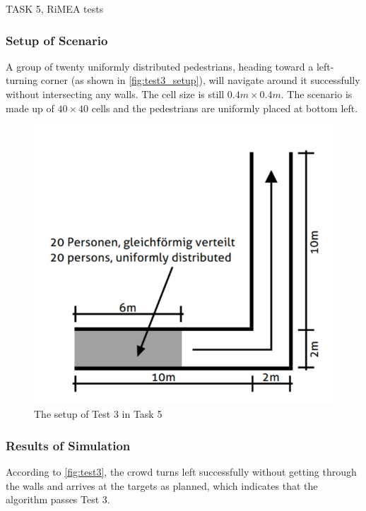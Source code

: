 \documentclass[10pt,a4paper]{article}
\begin{document}
\begin{task}{TASK 5, RiMEA tests}
\subsubsection{Setup of Scenario}

A group of twenty uniformly distributed pedestrians, heading toward a left-turning corner (as shown in \autoref{fig:test3_setup})\cite{RimeaGuidelines2016}, will navigate around it successfully without intersecting any walls. The cell size is still $0.4m \times 0.4m$. The scenario is made up of $40 \times 40$ cells and the pedestrians are uniformly placed at bottom left.

\begin{figure}
    \centering
    \includegraphics[width=0.5\linewidth]{pictures/test3_setup.png}
    \caption{The setup of Test 3 in Task 5}
    \label{fig:test3_setup}
\end{figure}

\subsubsection{Results of Simulation}

According to \autoref{fig:test3}, the crowd turns left successfully without getting through the walls and arrives at the targets as planned, which indicates that the algorithm passes Test 3.


\end{task}
\end{document}
